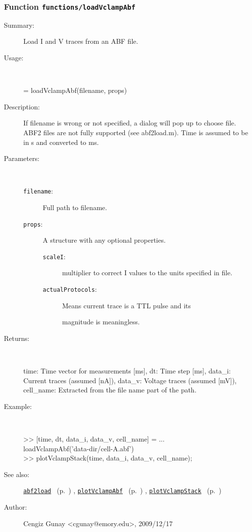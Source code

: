\subsubsection[Function \texttt{loadVclampAbf}]{Function \texttt{functions/loadVclampAbf}}%
%
\label{ref_functions__loadVclampAbf}%
\hypertarget{ref_functions__loadVclampAbf}{}%
\begin{description}
\item[Summary:]Load I and V traces from an ABF file.
%
\item[Usage:]~%
\begin{lyxcode}%
[time, dt, data\_i, data\_v, cell\_name] = loadVclampAbf(filename, props)
%
\end{lyxcode}%
%
\item[Description:]%
If filename is wrong or not specified, a dialog will pop up to choose
 file. ABF2 files are not fully supported (see abf2load.m). Time is
 assumed to be in s and converted to ms.
\item[Parameters:]~
\begin{description}%
\item[\texttt{filename}:]
 Full path to filename.
\item[\texttt{props}:]
 A structure with any optional properties.
\begin{description}%
\item[\texttt{scaleI}:]
 multiplier to correct I values to the units specified in file.
\item[\texttt{actualProtocols}:]
 Means current trace is a TTL pulse and its

magnitude is meaningless.
\end{description}%
\end{description}%
%
\item[Returns:
]~

   time: Time vector for measurements [ms],
   dt: Time step [ms],
   data\_i: Current traces (assumed [nA]),
   data\_v: Voltage traces (assumed [mV]),
   cell\_name: Extracted from the file name part of the path.
%
\item[Example:]~
\begin{lyxcode} >> [time, dt, data\_i, data\_v, cell\_name] = ...
\\%
    loadVclampAbf('data-dir/cell-A.abf')
\\%
 >> plotVclampStack(time, data\_i, data\_v, cell\_name);
\\%
\end{lyxcode}
%
\item[See also:]%
\hyperlink{ref_abf2load}{\texttt{abf2load}}%
\ (p.~\pageref{ref_abf2load})%
%
, \hyperlink{ref_plotVclampAbf}{\texttt{plotVclampAbf}}%
\ (p.~\pageref{ref_plotVclampAbf})%
%
, \hyperlink{ref_plotVclampStack}{\texttt{plotVclampStack}}%
\ (p.~\pageref{ref_plotVclampStack})%
%
%
\item[Author:]%
Cengiz Gunay <cgunay@emory.edu>, 2009/12/17
%
\end{description}
\methodline%
